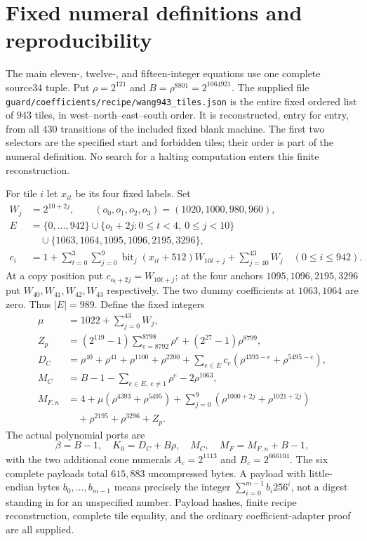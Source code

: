 \section{Fixed numeral definitions and reproducibility}
The main eleven-, twelve-, and fifteen-integer equations use one complete
source34 tuple. Put $\rho=2^{121}$ and $B=\rho^{8801}=2^{1064921}$.
The supplied file \texttt{guard/coefficients/recipe/wang943\_tiles.json}
is the entire fixed ordered list of $943$ tiles, in west--north--east--south
order. It is reconstructed, entry for entry, from all $430$ transitions of
the included fixed blank machine. The first two selectors are the specified
start and forbidden tiles; their order is part of the numeral definition.
No search for a halting computation enters this finite reconstruction.

For tile $i$ let $x_{it}$ be its four fixed labels. Set
\begin{align*}
 W_j&=2^{10+2j},\qquad (o_0,o_1,o_2,o_3)=(1020,1000,980,960),\\
 E&=\{0,\ldots,942\}\cup\{o_t+2j:0\le t<4,\ 0\le j<10\}\\
  &\quad\cup\{1063,1064,1095,1096,2195,3296\},\\
 c_i&=1+\sum_{t=0}^3\sum_{j=0}^9
       \operatorname{bit}_j(x_{it}+512)W_{10t+j}
       +\sum_{j=40}^{43}W_j\quad(0\le i\le942).
\end{align*}
At a copy position put $c_{o_t+2j}=W_{10t+j}$; at the four anchors
$1095,1096,2195,3296$ put $W_{40},W_{41},W_{42},W_{43}$ respectively.
The two dummy coefficients at $1063,1064$ are zero. Thus $|E|=989$.
Define the fixed integers
\begin{align*}
 \mu&=1022+\sum_{j=0}^{43}W_j,\\
 Z_p&=(2^{119}-1)\sum_{e=8792}^{8798}\rho^e
                  +(2^{27}-1)\rho^{8799},\\
 D_C&=\rho^{40}+\rho^{41}+\rho^{1100}+\rho^{2200}
       +\sum_{e\in E}c_e(\rho^{4393-e}+\rho^{5495-e}),\\
 M_C&=B-1-\sum_{e\in E,\ e\ne1}\rho^e-2\rho^{1063},\\
 M_{F,n}&=4+\mu(\rho^{4393}+\rho^{5495})
       +\sum_{j=0}^9(\rho^{1000+2j}+\rho^{1021+2j})\\
       &\quad+\rho^{2195}+\rho^{3296}+Z_p.
\end{align*}
The actual polynomial ports are
\[
 \beta=B-1,\quad K_0=D_C+B\rho,\quad M_C,\quad M_F=M_{F,n}+B-1,
\]
with the two additional cone numerals $A_c=2^{1113}$ and $B_c=2^{666104}$.
The six complete payloads total $615{,}883$ uncompressed bytes. A payload
with little-endian bytes $b_0,\ldots,b_{m-1}$ means precisely the integer
$\sum_{i=0}^{m-1}b_i256^i$, not a digest standing in for an unspecified
number. Payload hashes, finite recipe reconstruction, complete tile equality,
and the ordinary coefficient-adapter proof are all supplied.

